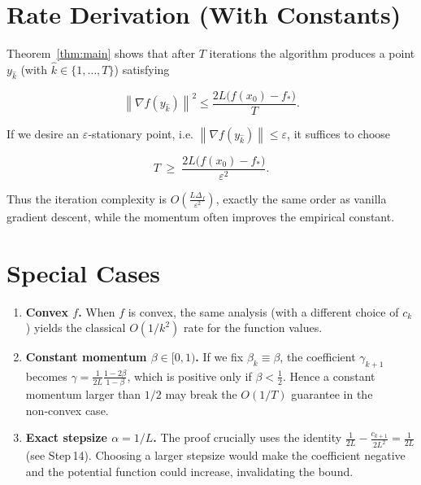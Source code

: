 \documentclass{article}
\newcommand{\norm}[1]{\left\lVert#1\right\rVert}
\newcommand{\grad}{\nabla}
\begin{document}
\section*{Rate Derivation (With Constants)}
Theorem~\ref{thm:main} shows that after $T$ iterations the algorithm
produces a point $y_{\hat{k}}$ (with $\hat{k}\in\{1,\dots,T\}$) satisfying  

\[
\norm{\grad f(y_{\hat{k}})}^{2}
\le \frac{2L\bigl(f(x_{0})-f_*\bigr)}{T}.
\]

If we desire an $\varepsilon$‑stationary point, i.e.
$\norm{\grad f(y_{\hat{k}})}\le\varepsilon$, it suffices to choose  

\[
T\;\ge\; \frac{2L\bigl(f(x_{0})-f_*\bigr)}{\varepsilon^{2}} .
\]

Thus the iteration complexity is $O\!\left(\frac{L\Delta_f}{\varepsilon^{2}}\right)$,
exactly the same order as vanilla gradient descent, while the momentum
often improves the empirical constant.

\section*{Special Cases}
\begin{enumerate}[label={\arabic*.}, leftmargin=*]
\item \textbf{Convex $f$.}  When $f$ is convex, the same analysis (with a
different choice of $c_k$) yields the classical $O(1/k^{2})$ rate for the
function values.
\item \textbf{Constant momentum $\beta\in[0,1)$.}  If we fix $\beta_k\equiv\beta$,
the coefficient $\gamma_{k+1}$ becomes
$\gamma = \frac{1}{2L}\frac{1-2\beta}{1-\beta}$,
which is positive only if $\beta<\tfrac12$.  Hence a constant momentum
larger than $1/2$ may break the $O(1/T)$ guarantee in the non‑convex case.
\item \textbf{Exact stepsize $\alpha=1/L$.}  The proof crucially uses the
identity $\frac{1}{2L}-\frac{c_{k+1}}{2L^{2}} = \frac{1}{2L}$ (see
Step 14).  Choosing a larger stepsize would make the coefficient negative
and the potential function could increase, invalidating the bound.
\end{enumerate}

\end{document}

